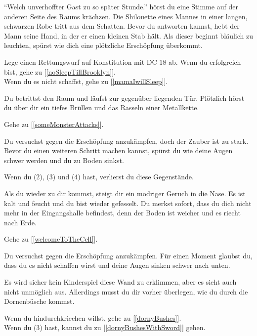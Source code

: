 ``Welch unverhoffter Gast zu so später Stunde.'' hörst du eine Stimme auf der anderen Seite des Raums krächzen. Die Shilouette eines Mannes in einer langen, schwarzen Robe tritt aus dem Schatten. Bevor du antworten kannst, hebt der Mann seine Hand, in der er einen kleinen Stab hält. Als dieser beginnt bläulich zu leuchten, spürst wie dich eine plötzliche Erschöpfung überkommt.

Lege einen Rettungswurf auf Konstitution mit DC 18 ab. Wenn du erfolgreich bist, gehe zu [\ref{noSleepTillBrooklyn}].
\\Wenn du es nicht schaffst, gehe zu [\ref{mamaIwillSleep}].


Du betrittst den Raum und läufst zur gegenüber liegenden Tür. Plötzlich hörst du über dir ein tiefes Brüllen und das Rasseln einer Metallkette.

Gehe zu [\ref{someMonsterAttacks}].


Du versuchst gegen die Erschöpfung anzukämpfen, doch der Zauber ist zu stark. Bevor du einen weiteren Schritt machen kannst, spürst du wie deine Augen schwer werden und du zu Boden sinkst.

Wenn du (2), (3) und (4) hast, verlierst du diese Gegenstände.

Als du wieder zu dir kommst, steigt dir ein modriger Geruch in die Nase. Es ist kalt und feucht und du bist wieder gefesselt. Du merkst sofort, dass du dich nicht mehr in der Eingangshalle befindest, denn der Boden ist weicher und es riecht nach Erde.

Gehe zu [\ref{welcomeToTheCell}].


Du versuchst gegen die Erschöpfung anzukämpfen. Für einen Moment glaubst du, dass du es nicht schaffen wirst und deine Augen sinken schwer nach unten.



Es wird sicher kein Kinderspiel diese Wand zu erklimmen, aber es sieht auch nicht unmöglich aus. Allerdings musst du dir vorher überlegen, wie du durch die Dornenbüsche kommst.

Wenn du hindurchkriechen willst, gehe zu [\ref{dornyBushes}].
\\Wenn du (3) hast, kannst du zu [\ref{dornyBushesWithSword}] gehen.

